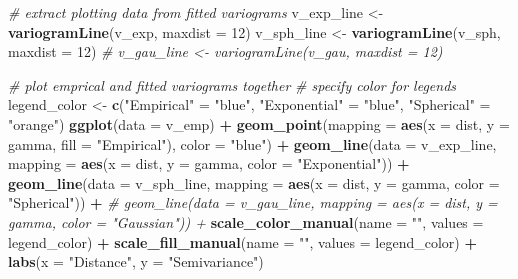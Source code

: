 \documentclass[]{book}
\newenvironment{Shaded}{\begin{snugshade}}{\end{snugshade}}
\newcommand{\CommentTok}[1]{\textcolor[rgb]{0.56,0.35,0.01}{\textit{#1}}}
\newcommand{\DataTypeTok}[1]{\textcolor[rgb]{0.13,0.29,0.53}{#1}}
\newcommand{\DecValTok}[1]{\textcolor[rgb]{0.00,0.00,0.81}{#1}}
\newcommand{\KeywordTok}[1]{\textcolor[rgb]{0.13,0.29,0.53}{\textbf{#1}}}
\newcommand{\NormalTok}[1]{#1}
\newcommand{\OperatorTok}[1]{\textcolor[rgb]{0.81,0.36,0.00}{\textbf{#1}}}
\newcommand{\StringTok}[1]{\textcolor[rgb]{0.31,0.60,0.02}{#1}}
\begin{document}
\begin{Shaded}
\begin{Highlighting}[]
\CommentTok{# extract plotting data from fitted variograms}
\NormalTok{v_exp_line <-}\StringTok{ }\KeywordTok{variogramLine}\NormalTok{(v_exp, }\DataTypeTok{maxdist =} \DecValTok{12}\NormalTok{)}
\NormalTok{v_sph_line <-}\StringTok{ }\KeywordTok{variogramLine}\NormalTok{(v_sph, }\DataTypeTok{maxdist =} \DecValTok{12}\NormalTok{)}
\CommentTok{# v_gau_line <- variogramLine(v_gau, maxdist = 12)}

\CommentTok{# plot emprical and fitted variograms together  }
\CommentTok{# specify color for legends}
\NormalTok{legend_color <-}\StringTok{ }\KeywordTok{c}\NormalTok{(}\StringTok{"Empirical"}\NormalTok{ =}\StringTok{ "blue"}\NormalTok{, }\StringTok{"Exponential"}\NormalTok{ =}\StringTok{ "blue"}\NormalTok{,}
                  \StringTok{"Spherical"}\NormalTok{ =}\StringTok{ "orange"}\NormalTok{)}
\KeywordTok{ggplot}\NormalTok{(}\DataTypeTok{data =}\NormalTok{ v_emp) }\OperatorTok{+}
\StringTok{  }\KeywordTok{geom_point}\NormalTok{(}\DataTypeTok{mapping =} \KeywordTok{aes}\NormalTok{(}\DataTypeTok{x =}\NormalTok{ dist, }\DataTypeTok{y =}\NormalTok{ gamma, }\DataTypeTok{fill =} \StringTok{"Empirical"}\NormalTok{), }\DataTypeTok{color =} \StringTok{"blue"}\NormalTok{) }\OperatorTok{+}
\StringTok{  }\KeywordTok{geom_line}\NormalTok{(}\DataTypeTok{data =}\NormalTok{ v_exp_line, }\DataTypeTok{mapping =} \KeywordTok{aes}\NormalTok{(}\DataTypeTok{x =}\NormalTok{ dist, }\DataTypeTok{y =}\NormalTok{ gamma, }\DataTypeTok{color =} \StringTok{"Exponential"}\NormalTok{)) }\OperatorTok{+}
\StringTok{  }\KeywordTok{geom_line}\NormalTok{(}\DataTypeTok{data =}\NormalTok{ v_sph_line, }\DataTypeTok{mapping =} \KeywordTok{aes}\NormalTok{(}\DataTypeTok{x =}\NormalTok{ dist, }\DataTypeTok{y =}\NormalTok{ gamma, }\DataTypeTok{color =} \StringTok{"Spherical"}\NormalTok{)) }\OperatorTok{+}
\StringTok{  }\CommentTok{# geom_line(data = v_gau_line, mapping = aes(x = dist, y = gamma, color = "Gaussian")) +}
\StringTok{  }\KeywordTok{scale_color_manual}\NormalTok{(}\DataTypeTok{name =} \StringTok{""}\NormalTok{, }\DataTypeTok{values =}\NormalTok{ legend_color) }\OperatorTok{+}
\StringTok{  }\KeywordTok{scale_fill_manual}\NormalTok{(}\DataTypeTok{name =} \StringTok{""}\NormalTok{, }\DataTypeTok{values =}\NormalTok{ legend_color) }\OperatorTok{+}
\StringTok{  }\KeywordTok{labs}\NormalTok{(}\DataTypeTok{x =} \StringTok{"Distance"}\NormalTok{,}
       \DataTypeTok{y =} \StringTok{"Semivariance"}\NormalTok{)}
\end{Highlighting}
\end{Shaded}
\end{document}
